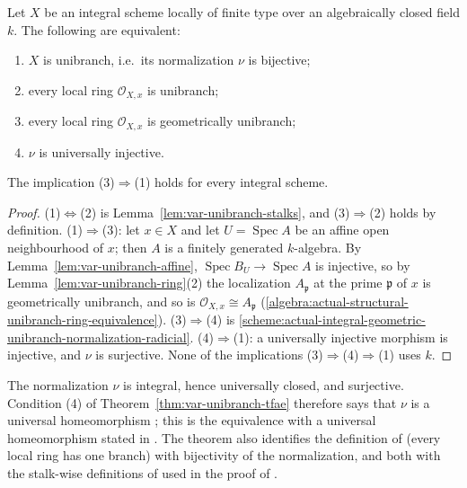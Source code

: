\begin{theorem}\label{thm:var-unibranch-tfae}
\leanok
{}
Let $X$ be an integral scheme locally of finite type over an algebraically closed field $k$. The
following are equivalent:
\begin{enumerate}
\item $X$ is unibranch, i.e.\ its normalization $\nu$ is bijective;
\item every local ring $\mathcal O_{X,x}$ is unibranch;
\item every local ring $\mathcal O_{X,x}$ is geometrically unibranch;
\item $\nu$ is universally injective.
\end{enumerate}
The implication (3)$\Rightarrow$(1) holds for every integral scheme.
\end{theorem}

\begin{proof}
(1)$\Leftrightarrow$(2) is Lemma~\ref{lem:var-unibranch-stalks}, and (3)$\Rightarrow$(2) holds by
definition. (1)$\Rightarrow$(3): let $x\in X$ and let $U=\operatorname{Spec}A$ be an affine open
neighbourhood of $x$; then $A$ is a finitely generated $k$-algebra. By
Lemma~\ref{lem:var-unibranch-affine}, $\operatorname{Spec}B_U\to\operatorname{Spec}A$ is
injective, so by Lemma~\ref{lem:var-unibranch-ring}(2) the localization $A_{\mathfrak p}$ at the
prime $\mathfrak p$ of $x$ is geometrically unibranch, and so is
$\mathcal O_{X,x}\cong A_{\mathfrak p}$
(\ref{algebra:actual-structural-unibranch-ring-equivalence}). (3)$\Rightarrow$(4) is
\ref{scheme:actual-integral-geometric-unibranch-normalization-radicial}. (4)$\Rightarrow$(1): a
universally injective morphism is injective, and $\nu$ is surjective. None of the implications
(3)$\Rightarrow$(4)$\Rightarrow$(1) uses $k$.
\end{proof}

\begin{remark}\label{rmk:var-unibranch-universal-homeomorphism}
The normalization $\nu$ is integral, hence universally closed, and surjective. Condition (4) of
Theorem~\ref{thm:var-unibranch-tfae} therefore says that $\nu$ is a universal homeomorphism
\cite[Tag~04DF]{Stacks}; this is the equivalence with a universal homeomorphism stated in
\cite[\S1.1]{FHX}. The theorem also identifies the definition of \cite[\S1.1]{FHX} (every local
ring has one branch) with bijectivity of the normalization, and both with the stalk-wise
definitions of \cite[Tag~0BQ2]{Stacks} used in the proof of \cite[Lemma~8.1]{FHX}.
\end{remark}

